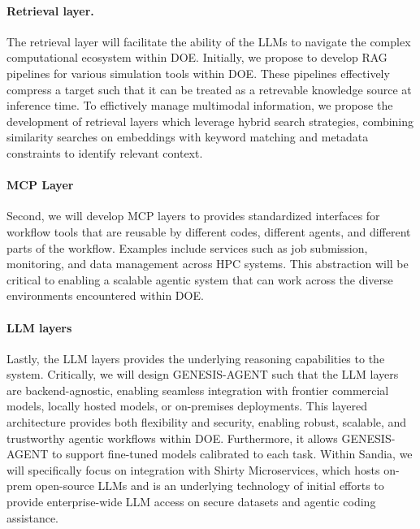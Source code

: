 \documentclass[11pt]{article} \usepackage[margin=1in]{geometry}
\begin{document}
\paragraph{Retrieval layer.} The retrieval layer will facilitate the ability of the
LLMs to navigate the complex computational ecosystem within DOE. Initially, we
propose to develop RAG pipelines for various simulation tools within DOE. These
pipelines effectively compress a target such that it can be treated as a
retrevable knowledge source at inference time. To effictively manage multimodal
information, we propose the development of retrieval layers which leverage
hybrid search strategies, combining similarity searches on embeddings with
keyword matching and metadata constraints to identify relevant context. 
 

\paragraph{MCP Layer}
Second, we will develop MCP layers to provides
standardized interfaces for workflow tools that are reusable by
different codes, different agents, and different parts of the workflow. Examples
include services such as job submission, monitoring, and data management across
HPC systems. This abstraction will be critical to enabling a scalable agentic
system that can work across the diverse environments encountered within DOE.

\paragraph{LLM layers}
Lastly, the LLM layers provides the underlying reasoning capabilities to the
system. Critically, we will design GENESIS-AGENT such that the LLM layers are backend-agnostic,
enabling seamless integration with frontier commercial models, locally hosted
models, or on-premises deployments. This layered architecture provides both
flexibility and security, enabling robust, scalable, and trustworthy agentic
workflows within DOE. Furthermore, it allows GENESIS-AGENT to support fine-tuned
models calibrated to each task. Within Sandia, we will specifically focus on integration
with Shirty Microservices, which hosts on-prem open-source LLMs and is an
underlying technology of initial efforts to provide enterprise-wide LLM access
on secure datasets and agentic
coding assistance.
\end{document}

